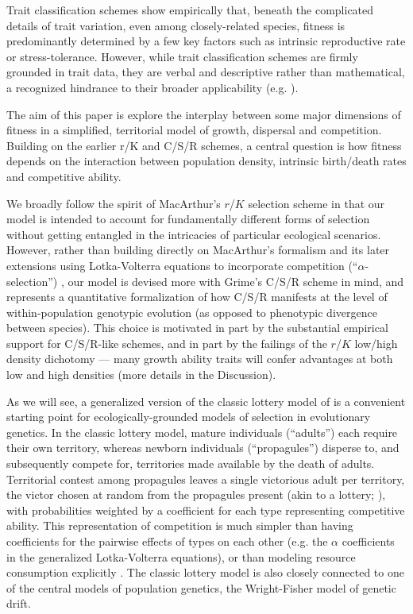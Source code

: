 \documentclass[11pt]{article}
\begin{document}
Trait classification schemes show empirically that, beneath the complicated details of trait variation, even among closely-related species, fitness is predominantly determined by a few key factors such as intrinsic reproductive rate or stress-tolerance. However, while trait classification schemes are firmly grounded in trait data, they are verbal and descriptive rather than mathematical, a recognized hindrance to their broader applicability (e.g. \citealt{tilman_2007}). 

The aim of this paper is explore the interplay between some major dimensions of fitness in a simplified, territorial model of growth, dispersal and competition. Building on the earlier r/K and C/S/R schemes, a central question is how fitness depends on the interaction between population density, intrinsic birth/death rates and competitive ability. 

We broadly follow the spirit of MacArthur's $r$/$K$ selection scheme in that our model is intended to account for fundamentally different forms of selection without getting  entangled in the intricacies of particular ecological scenarios. However, rather than building directly on MacArthur's formalism and its later extensions using Lotka-Volterra equations to incorporate competition (``$\alpha$-selection'') \citep{gill_1974,case_1974,joshi_2001}, our model is devised more with Grime's C/S/R scheme in mind, and represents a quantitative formalization of how C/S/R manifests at the level of within-population genotypic evolution (as opposed to phenotypic divergence between species). This choice is motivated in part by the substantial empirical support for C/S/R-like schemes, and in part by the failings of the $r$/$K$ low/high density dichotomy --- many growth ability traits will confer advantages at both low and high densities (more details in the Discussion). 

As we will see, a generalized version of the classic lottery model of \cite{chesson_1981} is a convenient starting point for ecologically-grounded models of selection in evolutionary genetics. In the classic lottery model, mature individuals (``adults'') each require their own territory, whereas newborn individuals (``propagules'') disperse to, and subsequently compete for, territories made available by the death of adults. Territorial contest among propagules leaves a single victorious adult per territory, the victor chosen at random from the propagules present (akin to a lottery; \citealt{sale_77}), with probabilities weighted by a coefficient for each type representing competitive ability. This representation of competition is much simpler than having coefficients for the pairwise effects of types on each other (e.g. the $\alpha$ coefficients in the generalized Lotka-Volterra equations), or than modeling resource consumption explicitly \citep{tilman_1982}. The classic lottery model is also closely connected to one of the central models of population genetics, the Wright-Fisher model of genetic drift. 
\end{document}
